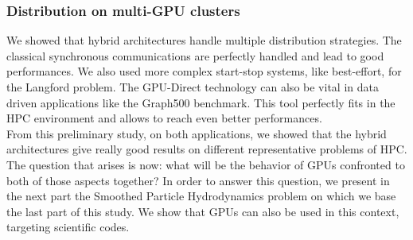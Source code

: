 \subsubsection{Distribution on multi-GPU clusters}
We showed that hybrid architectures handle multiple distribution strategies. 
The classical synchronous communications are perfectly handled and lead to good performances. 
We also used more complex start-stop systems, like best-effort, for the Langford problem. 
The GPU-Direct technology can also be vital in data driven applications like the Graph500 benchmark.
This tool perfectly fits in the HPC environment and allows to reach even better performances. \\

From this preliminary study, on both applications, we showed that the hybrid architectures give really good results on different representative problems of HPC. 
The question that arises is now: what will be the behavior of GPUs confronted to both of those aspects together? 
In order to answer this question, we present in the next part the Smoothed Particle Hydrodynamics problem on which we base the last part of this study. 
We show that GPUs can also be used in this context, targeting scientific codes.\\
